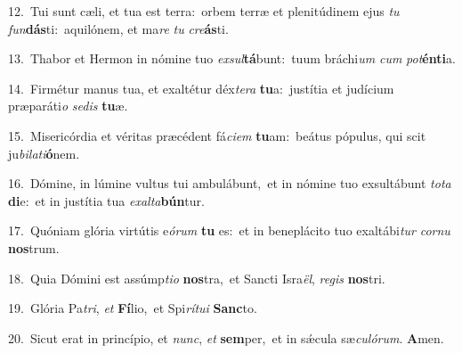 {\numbfont\textcolor{\numbcolor}{12.}}~Tui sunt cæli, et tua est terra:~\dagger orbem terræ et plenitúdinem ejus \textit{tu} \textit{fun}\-\textbf{dás}ti:~\star aquilónem, et ma\textit{re} \textit{tu} \textit{cre}\-\textbf{ás}ti.\par
{\numbfont\textcolor{\numbcolor}{13.}}~Thabor et Hermon in nómine tuo \textit{ex}\-\textit{sul}\textbf{tá}bunt:~\star tuum bráchi\textit{um} \textit{cum} \textit{pot}\-\textbf{én}\textbf{ti}a.\par
{\numbfont\textcolor{\numbcolor}{14.}}~Firmétur manus tua, et exaltétur déx\-\textit{te}\-\textit{ra} \textbf{tu}\-a:~\star justítia et judícium præparáti\textit{o} \textit{se}\-\textit{dis} \textbf{tu}\-æ.\par
{\numbfont\textcolor{\numbcolor}{15.}}~Misericórdia et véritas præcédent fá\-\textit{ci}\-\textit{em} \textbf{tu}\-am:~\star beátus pópulus, qui scit ju\-\textit{bi}\-\textit{la}\textit{ti}\textbf{ó}nem.\par
{\numbfont\textcolor{\numbcolor}{16.}}~Dómine, in lúmine vultus tui ambulábunt,~\dagger et in nómine tuo exsultábunt \textit{to}\-\textit{ta} \textbf{di}\-e:~\star et in justítia tua \textit{ex}\-\textit{al}\textit{ta}\textbf{bún}tur.\par
{\numbfont\textcolor{\numbcolor}{17.}}~Quóniam glória virtútis e\-\textit{ó}\-\textit{rum} \textbf{tu} es:~\star et in beneplácito tuo exaltábi\textit{tur} \textit{cor}\-\textit{nu} \textbf{nos}\-trum.\par
{\numbfont\textcolor{\numbcolor}{18.}}~Quia Dómini est assúmp\-\textit{ti}\-\textit{o} \textbf{nos}\-tra,~\star et Sancti Isra\-\textit{ël}\-, \textit{re}\-\textit{gis} \textbf{nos}\-tri.\par
{\numbfont\textcolor{\numbcolor}{19.}}~Glória Pa\-\textit{tri}\-, \textit{et} \textbf{Fí}\-lio,~\star et Spi\-\textit{rí}\-\textit{tu}\textit{i} \textbf{Sanc}\-to.\par
{\numbfont\textcolor{\numbcolor}{20.}}~Sicut erat in princípio, et \textit{nunc}\-, \textit{et} \textbf{sem}\-per,~\star et in sǽcula sæ\-\textit{cu}\-\textit{ló}\textit{rum}. \textbf{A}\-men.\par
